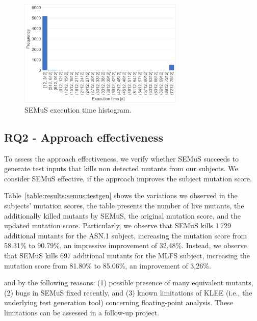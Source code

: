     \begin{figure}[h]
    \centering
        \includegraphics[width=0.7\textwidth]{images/execution_time}
        \caption{SEMuS execution time histogram.}
        \label{fig:semus:histogram_time}
    \end{figure}

\subsection{RQ2 - Approach effectiveness}


To assess the approach effectiveness, we verify whether SEMuS succeeds to generate test inputs that kills non detected mutants from our subjects. We consider SEMuS effective, if the approach improves the subject mutation score.

Table~\ref{table:results:semus:testgen} shows the variations we observed in the subjects' mutation scores, the table presents the number of live mutants, the additionally killed mutants by SEMuS, the original mutation score, and the updated mutation score.
Particularly, we observe that SEMuS kills  1\,729 additional mutants for the ASN.1 subject, increasing the mutation score from 58.31\% to 90.79\%, an impressive improvement of 32,48\%.
Instead, we observe that SEMuS kills  697 additional mutants for the MLFS subject, increasing the mutation score from 81.80\% to 85.06\%, an improvement of 3,26\%.


 and by the following reasons: (1) possible presence of many equivalent mutants, (2) bugs in SEMuS fixed recently, and (3) known limitations of KLEE (i.e., the underlying test generation tool) concerning floating-point analysis. These limitations can be assessed in a follow-up project.

